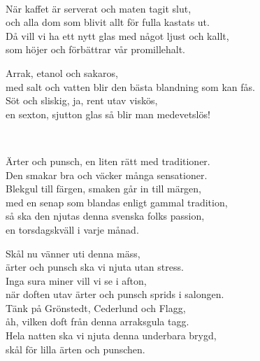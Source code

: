 
 \\       

\songtext{}
När kaffet är serverat och maten tagit slut,\\
och alla dom som blivit allt för fulla kastats ut.\\Då vill vi ha ett nytt glas med något ljust och kallt,\\
som höjer och förbättrar vår promillehalt.

Arrak, etanol och sakaros,\\
med salt och vatten blir den bästa blandning som kan fås.\\
Söt och sliskig, ja, rent utav viskös,\\
en sexton, sjutton glas så blir man medevetslös!\\

\newpage


 \\       

\songtext{} 
Ärter och punsch, en liten rätt med traditioner.\\
Den smakar bra och väcker många sensationer.\\
Blekgul till färgen, smaken går in till märgen,\\
med en senap som blandas enligt gammal tradition,\\
så ska den njutas denna svenska folks passion,\\
en torsdagskväll i varje månad.

Skål nu vänner uti denna mäss,\\
ärter och punsch ska vi njuta utan stress.\\
Inga sura miner vill vi se i afton,\\
när doften utav ärter och punsch sprids i salongen.\\
Tänk på Grönstedt, Cederlund och Flagg,\\
åh, vilken doft från denna arraksgula tagg.\\
Hela natten ska vi njuta denna underbara brygd,\\
skål för lilla ärten och punschen.\\

\newpage


